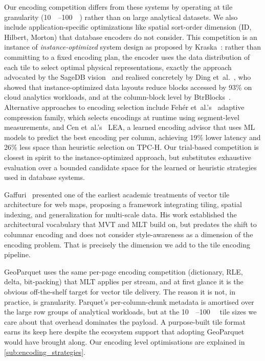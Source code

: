 Our encoding competition differs from these systems by operating at tile granularity (\qtyrange{10}{100}{\kilo\byte}) rather than on large analytical datasets.
We also include application-specific optimizations like spatial sort-order dimension (ID, Hilbert, Morton) that database encoders do not consider.
This competition is an instance of \emph{instance-optimized} system design as proposed by Kraska~\cite{dingSageDBInstanceOptimizedData2022}: rather than committing to a fixed encoding plan, the encoder uses the data distribution of each tile to select optimal physical representations, exactly the approach advocated by the SageDB vision~\cite{dingSageDBInstanceOptimizedData2022} and realised concretely by Ding et~al.~\cite{dingInstanceOptimizedDataLayouts2021}, who showed that instance-optimized data layouts reduce blocks accessed by 93\% on cloud analytics workloads, and at the column-block level by BtrBlocks~\cite{kuschewskiBtrBlocksEfficientColumnar2023}.
Alternative approaches to encoding selection include Fehér et~al.'s~\cite{feherAdaptiveColumnCompression2022} adaptive compression family, which selects encodings at runtime using segment-level measurements, and Cen et~al.'s~\cite{cenLEALearnedEncoding2021} LEA, a learned encoding advisor that uses ML models to predict the best encoding per column, achieving 19\% lower latency and 26\% less space than heuristic selection on TPC-H.
Our trial-based competition is closest in spirit to the instance-optimized approach, but substitutes exhaustive evaluation over a bounded candidate space for the learned or heuristic strategies used in database systems.

Gaffuri~\cite{gaffuriWebMappingVector2012} presented one of the earliest academic treatments of vector tile architecture for web maps, proposing a framework integrating tiling, spatial indexing, and generalization for multi-scale data.
His work established the architectural vocabulary that \ac{MVT} and \ac{MLT} build on, but predates the shift to columnar encoding and does not consider style-awareness as a dimension of the encoding problem.
That is precisely the dimension we add to the tile encoding pipeline.

GeoParquet uses the same per-page encoding competition (dictionary, \ac{RLE}, delta, bit-packing) that \ac{MLT} applies per stream, and at first glance it is the obvious off-the-shelf target for vector tile delivery.
The reason it is not, in practice, is granularity.
Parquet's per-column-chunk metadata is amortised over the large row groups of analytical workloads, but at the \qtyrange{10}{100}{\kilo\byte} tile sizes we care about that overhead dominates the payload.
A purpose-built tile format earns its keep here despite the ecosystem support that adopting GeoParquet would have brought along.
Our encoding level optimisations are explained in \cref{sub:encoding_strategies}.

